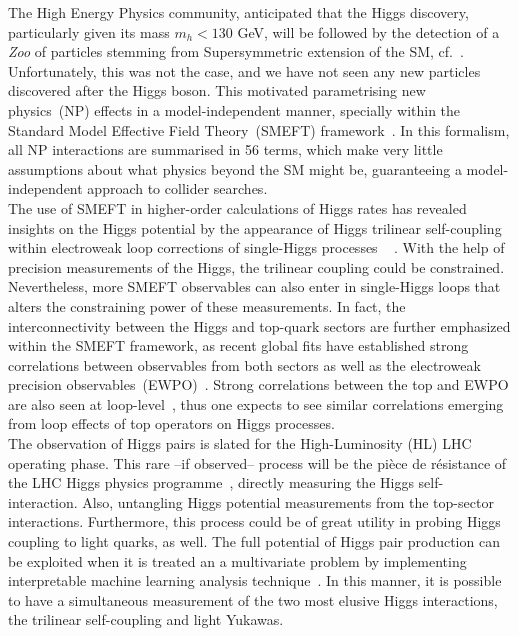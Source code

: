  The High Energy Physics community, anticipated that the Higgs discovery, particularly given its mass $ m_h <130$ GeV, will be followed by the detection of a \emph{Zoo} of particles stemming from Supersymmetric extension of the SM, cf.~\cite{handle:20.500.11811/5384}. Unfortunately, this was not the case, and we have not seen any new particles discovered after the Higgs boson. This motivated parametrising new physics~(NP) effects in a model-independent manner, specially within the Standard Model Effective Field Theory~(SMEFT) framework~\cite{Grzadkowski:2010es,Alonso:2013hga}. In this formalism, all NP interactions are summarised in 56 terms, which make very little assumptions about what physics beyond the SM might be, guaranteeing a  model-independent approach to collider searches. \\ 
 The use of SMEFT in higher-order calculations of Higgs rates has revealed insights on the Higgs potential by the appearance of Higgs trilinear self-coupling within electroweak loop corrections of single-Higgs processes ~\cite{DiVita:2017vrr} . With the help of precision measurements of the Higgs, the trilinear coupling could be constrained\cite{DiMicco:2019ngk}. Nevertheless, more SMEFT observables can also enter in single-Higgs loops that alters the constraining power of these measurements. In fact, the interconnectivity between the Higgs and top-quark sectors are further emphasized within the SMEFT framework, as recent global fits have established strong correlations between observables from both sectors as well as the electroweak precision observables~(EWPO)~\cite{Ellis:2020unq}. Strong correlations between the top and EWPO are also seen at loop-level~\cite{Dawson:2020oco}, thus one expects to see similar correlations emerging from loop effects of top operators  on Higgs processes. \\
 The observation of Higgs pairs is slated for the High-Luminosity (HL) LHC operating phase. This rare --if observed-- process will be the pi\`ece de r\'esistance of the LHC Higgs physics programme~\cite{Bernius:2666331}, directly measuring the Higgs self-interaction. Also, untangling Higgs potential measurements  from the top-sector interactions. Furthermore,  this process could be of great utility in probing Higgs coupling to light quarks, as well. The full potential of Higgs pair production can be exploited when it is treated an a multivariate problem by implementing interpretable machine learning analysis technique~\cite{Grojean:2020ech}. In this manner, it is possible to have a simultaneous measurement of the two most elusive Higgs interactions, the trilinear self-coupling and light Yukawas.\\
